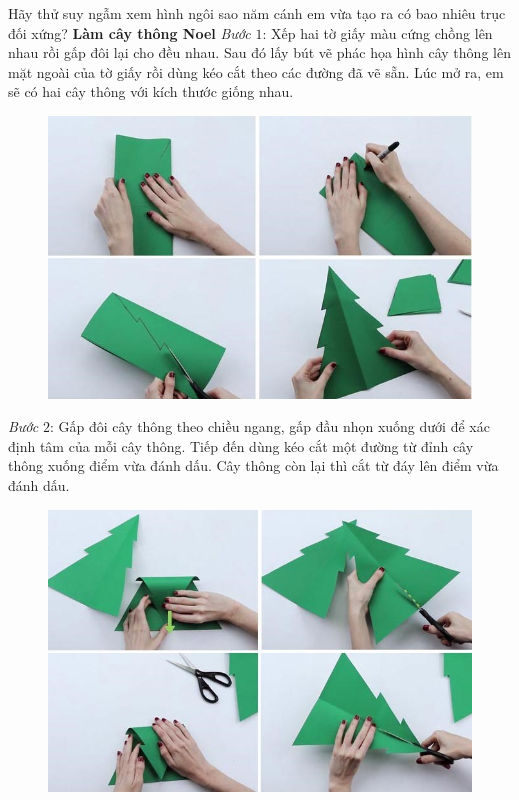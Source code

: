 \begin{multicols}{2}
	Hãy thử suy ngẫm xem hình ngôi sao năm cánh em vừa tạo ra có bao nhiêu trục đối xứng?
	\vskip 0.1cm
	\textbf{\color{toancuabi}Làm cây thông Noel}
	\vskip 0.1cm
	\textit{Bước} $1$: Xếp hai tờ giấy màu cứng chồng lên nhau rồi gấp đôi lại cho đều nhau. Sau đó lấy bút vẽ phác họa hình cây thông lên mặt ngoài của tờ giấy rồi dùng kéo cắt theo các đường đã vẽ sẵn. Lúc mở ra, em sẽ có hai cây thông với kích thước giống nhau.
	\begin{figure}[H]
		\vspace*{-5pt}
		\centering
		\captionsetup{labelformat= empty, justification=centering}
		\includegraphics[width= 1\linewidth]{6}
		\vspace*{-15pt}
	\end{figure}
	\textit{Bước} $2$: Gấp đôi cây thông theo chiều ngang, gấp đầu nhọn xuống dưới để xác định tâm của mỗi cây thông. Tiếp đến dùng kéo cắt một đường từ đỉnh cây thông xuống điểm vừa đánh dấu. Cây thông còn lại thì cắt từ đáy lên điểm vừa đánh dấu.
	\begin{figure}[H]
		\vspace*{-5pt}
		\centering
		\captionsetup{labelformat= empty, justification=centering}
		\includegraphics[width= 1\linewidth]{7}

\end{figure}
\end{multicols}
